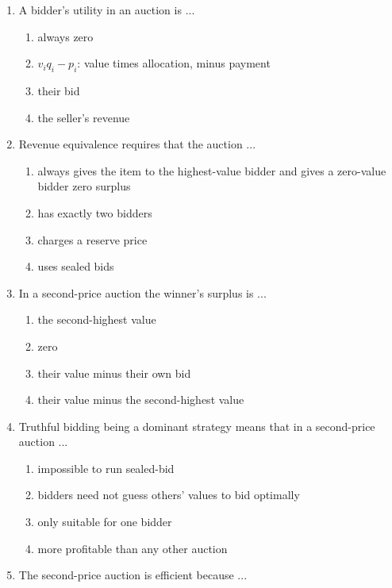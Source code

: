 \documentclass[11pt]{article}
\begin{document}
\begin{enumerate}[itemsep=6pt]
  \begin{enumerate}
    \item \(v/2\) for all \(N\)
    \item \(\frac{N-1}{N} v\)
    \item \(v\)
    \item \(0\)
  \end{enumerate}
  \item A bidder's utility in an auction is ...
  \begin{enumerate}
    \item always zero
    \item \(v_i q_i - p_i\): value times allocation, minus payment
    \item their bid
    \item the seller's revenue
  \end{enumerate}
  \item Revenue equivalence requires that the auction ...
  \begin{enumerate}
    \item always gives the item to the highest-value bidder and gives a zero-value bidder zero surplus
    \item has exactly two bidders
    \item charges a reserve price
    \item uses sealed bids
  \end{enumerate}
  \item In a second-price auction the winner's surplus is ...
  \begin{enumerate}
    \item the second-highest value
    \item zero
    \item their value minus their own bid
    \item their value minus the second-highest value
  \end{enumerate}
  \item Truthful bidding being a dominant strategy means that in a second-price auction ...
  \begin{enumerate}
    \item impossible to run sealed-bid
    \item bidders need not guess others' values to bid optimally
    \item only suitable for one bidder
    \item more profitable than any other auction
  \end{enumerate}
  \item The second-price auction is efficient because ...

\end{enumerate}
\end{document}
